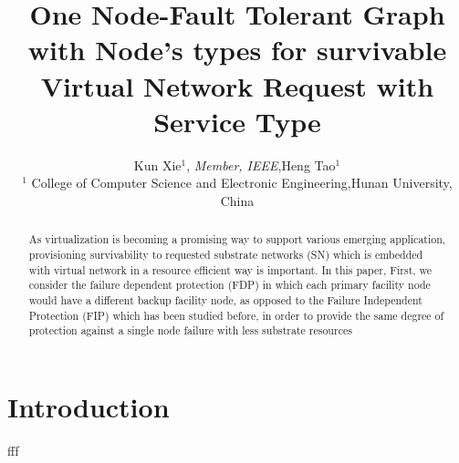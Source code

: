 \documentclass[10pt,journal,letterpaper]{IEEEtran1}
\begin{document}
\title{One Node-Fault Tolerant Graph with Node's types for survivable Virtual Network Request with Service Type}
\author{Kun Xie$^1$, \emph{Member, IEEE},Heng Tao$^1$\\
$^1$ College of Computer Science and Electronic Engineering,Hunan University, China\\}

\maketitle
\vspace{-3em}
\begin{abstract}
As virtualization is becoming a promising way to support various emerging application, provisioning survivability to requested
substrate networks (SN) which is embedded with virtual network in a resource efficient way is important. In this paper, First, we consider the
failure dependent protection (FDP) in which each primary facility node would have a different backup facility node, as opposed to the Failure Independent Protection (FIP) which has been studied before, in order to provide the same degree of protection against a single node failure with less substrate resources
\end{abstract}

\section{Introduction}
fff






\end{document}
